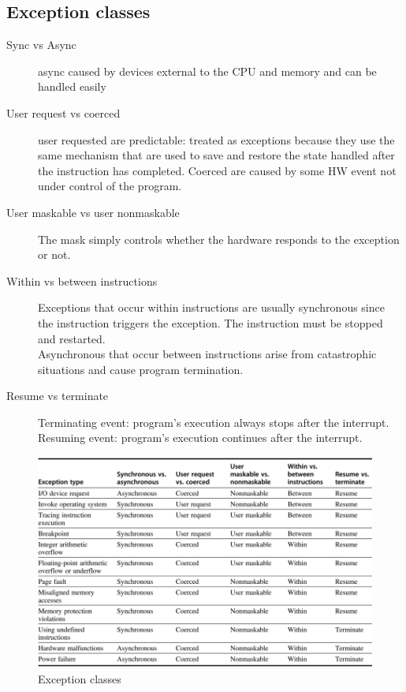 \subsection{Exception classes}\label{subsec:exception-classes}
\begin{description}
    \item[Sync vs Async] async caused by devices external to the CPU and memory and can be handled easily
    \item[User request vs coerced] user requested are predictable: treated as exceptions because they use the same
    mechanism that are used to save and restore the state handled after the instruction has completed.
    Coerced are caused by some HW event not under control of the program.
    \item[User maskable vs user nonmaskable] The mask simply controls whether the hardware responds to the
    exception or not.
    \item[Within vs between instructions] Exceptions that occur within instructions are usually
    synchronous since the instruction triggers the exception.
    The instruction must be stopped and restarted.\\
    Asynchronous that occur between instructions arise from
    catastrophic situations and cause program termination.
    \item[Resume vs terminate] Terminating event: program’s execution always stops after the
    interrupt.
    Resuming event: program’s execution continues after the
    interrupt.
\end{description}

\begin{figure}[h]
    \centering
    \includegraphics[scale = 0.25]{images/classes-of-exception}
    \caption{Exception classes}
    \label{fig:exception-classes}
\end{figure}

